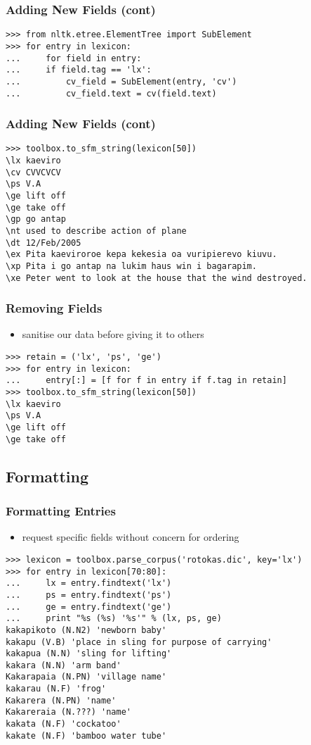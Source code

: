 \documentclass{beamer}             %
\begin{document}
\begin{frame}[fragile]
\frametitle{Adding New Fields (cont)}
\small

\begin{verbatim}
>>> from nltk.etree.ElementTree import SubElement
>>> for entry in lexicon:
...     for field in entry:
...	    if field.tag == 'lx':
...         cv_field = SubElement(entry, 'cv')
...         cv_field.text = cv(field.text)
\end{verbatim}
\end{frame}

\begin{frame}[fragile]
\frametitle{Adding New Fields (cont)}
\scriptsize
\begin{verbatim}
>>> toolbox.to_sfm_string(lexicon[50])
\lx kaeviro
\cv CVVCVCV
\ps V.A
\ge lift off
\ge take off
\gp go antap
\nt used to describe action of plane
\dt 12/Feb/2005
\ex Pita kaeviroroe kepa kekesia oa vuripierevo kiuvu.
\xp Pita i go antap na lukim haus win i bagarapim.
\xe Peter went to look at the house that the wind destroyed.
\end{verbatim}
\end{frame}

\begin{frame}[fragile]
\frametitle{Removing Fields}
\scriptsize

\begin{itemize}
\item sanitise our data before giving it to others
\end{itemize}

\small
\begin{verbatim}
>>> retain = ('lx', 'ps', 'ge')
>>> for entry in lexicon:
...     entry[:] = [f for f in entry if f.tag in retain]
>>> toolbox.to_sfm_string(lexicon[50])
\lx kaeviro
\ps V.A
\ge lift off
\ge take off
\end{verbatim}
\end{frame}

\subsection{Formatting}

\begin{frame}[fragile]
\frametitle{Formatting Entries}

\begin{itemize}
\item request specific fields without concern for ordering
\end{itemize}
\scriptsize

\begin{verbatim}
>>> lexicon = toolbox.parse_corpus('rotokas.dic', key='lx')
>>> for entry in lexicon[70:80]:
...     lx = entry.findtext('lx')
...     ps = entry.findtext('ps')
...     ge = entry.findtext('ge')
...     print "%s (%s) '%s'" % (lx, ps, ge)
kakapikoto (N.N2) 'newborn baby'
kakapu (V.B) 'place in sling for purpose of carrying'
kakapua (N.N) 'sling for lifting'
kakara (N.N) 'arm band'
Kakarapaia (N.PN) 'village name'
kakarau (N.F) 'frog'
Kakarera (N.PN) 'name'
Kakareraia (N.???) 'name'
kakata (N.F) 'cockatoo'
kakate (N.F) 'bamboo water tube'
\end{verbatim}
\end{frame}
\end{document}
